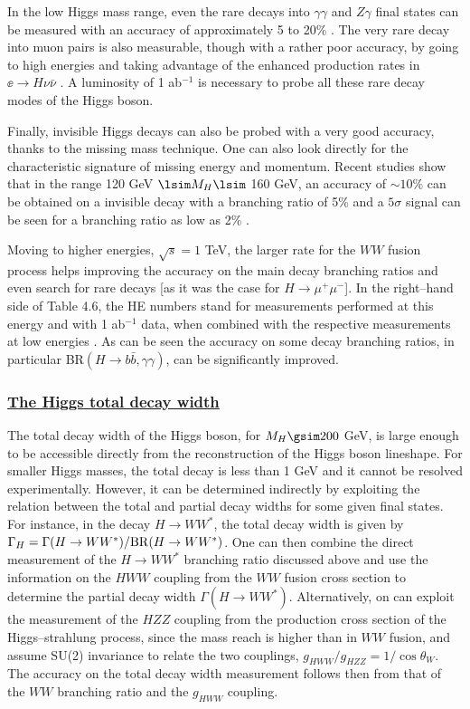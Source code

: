 In the low Higgs mass range, even the rare decays into $\gamma \gamma$ and $Z
\gamma$ final states can be measured with an accuracy of approximately 5 to 20\%
\cite{ee-pp-ex,ee-pZ-ex,Barklow}. The very rare decay into muon pairs is also
measurable, though with a rather poor accuracy, by going to high energies and
taking advantage of the enhanced production rates in $\ee \to H\nu \bar \nu$
\cite{ee-mu-ex}. A luminosity of 1 ab$^{-1}$ is necessary to probe all these
rare decay modes of the Higgs boson.\s

Finally, invisible Higgs decays can also be probed with a 
very good accuracy, thanks to the missing mass technique. One can also look 
directly for the characteristic signature of missing energy and momentum.
Recent studies show that in the range 120 GeV $\lsim M_H \lsim$ 160 GeV, 
an accuracy of $\sim 10\%$ can be obtained on a invisible decay with a branching
ratio of 5\% and a $5\sigma$ signal can be seen for a branching ratio as low 
as 2\% \cite{ee-Hinv-ex}.\s

Moving to higher energies, $\sqrt{s}=1$ TeV, the larger rate for 
the $WW$ fusion process helps improving the accuracy on the main decay 
branching ratios and even search for rare decays 
[as it was the case for $H\to \mu^+ \mu^-$]. In the right--hand side of 
Table 4.6, the HE numbers stand for measurements performed at this energy 
and with 1 ab$^{-1}$ data, when combined with the respective 
measurements at low energies \cite{Barklow}. As can be seen the accuracy on 
some decay branching ratios, in particular BR$(H\to b\bar{b}, \gamma \gamma)$, 
can be significantly improved. 

\subsubsection*{\underline{The Higgs total decay width}}
\vspace*{-1mm}

The total decay width of the Higgs boson, for $M_H \gsim 200$ GeV, is large 
enough to be accessible directly from the reconstruction of the Higgs  boson 
lineshape. For smaller Higgs masses, the total decay is less than 1 GeV and it
cannot be resolved experimentally.  However, it can be determined indirectly by
exploiting the relation between the total and partial decay widths for some
given final states. For instance, in the decay $H\to WW^*$, the total decay
width is given by $\Gamma_H = \Gamma(H \to WW^*)/{\rm BR}(H \to WW^*)$.
One can then combine the direct measurement of the $H \to WW^*$ branching ratio
discussed above and use the information on the $HWW$ coupling from the $WW$
fusion cross section to determine the partial decay width $\Gamma (H\to WW^*)$. 
Alternatively, on can exploit the measurement of the $HZZ$ coupling from the 
production cross section of the Higgs--strahlung process, since the mass reach
is higher than in $WW$ fusion,  and assume SU(2) invariance to relate the two 
couplings, $g_{HWW}/g_{HZZ} = 1/\cos\theta_W$. The accuracy on the total decay
width measurement follows then from that of the $WW$ branching ratio and the
$g_{HWW}$ coupling. 


